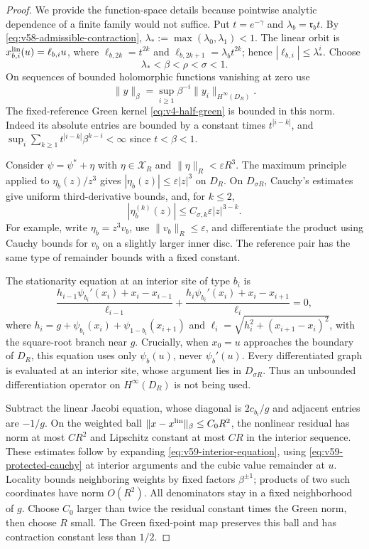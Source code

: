 \begin{proof}
We provide the function-space details because pointwise analytic dependence
of a finite family would not suffice.  Put $t=e^{-\gamma}$ and
$\lambda_b=\mathfrak r_bt$.  By
\eqref{eq:v58-admissible-contraction},
$\lambda_*:=\max(\lambda_0,\lambda_1)<1$.  The linear orbit is
$x^{\rm lin}_{b,i}(u)=\ell_{b,i}u$, where
$\ell_{b,2k}=t^{2k}$ and
$\ell_{b,2k+1}=\lambda_bt^{2k}$; hence
$|\ell_{b,i}|\le\lambda_*^i$.  Choose
\[
                   \lambda_*<\beta<\rho<\sigma<1.
\]
On sequences of bounded holomorphic functions vanishing at zero use
\[
 \|y\|_\beta=\sup_{i\ge1}\beta^{-i}\|y_i\|_{H^\infty(D_R)}.
\]
The fixed-reference Green kernel \eqref{eq:v4-half-green} is bounded
in this norm.  Indeed its absolute entries are bounded by a constant
times $t^{|i-k|}$, and
$\sup_i\sum_{k\ge1}t^{|i-k|}\beta^{k-i}<\infty$ since $t<\beta<1$.

Consider $\psi=\psi^*+\eta$ with
$\eta\in\mathscr X_R$ and $\|\eta\|_R<\varepsilon R^3$.
The maximum principle applied to $\eta_b(z)/z^3$ gives
$|\eta_b(z)|\le\varepsilon|z|^3$ on $D_R$.
On $D_{\sigma R}$, Cauchy's estimates give uniform third-derivative
bounds, and, for $k\le2$,
\begin{equation}\label{eq:v59-protected-cauchy}
 |\eta_b^{(k)}(z)|\le C_{\sigma,k}\varepsilon|z|^{3-k}.
\end{equation}
For example, write $\eta_b=z^3v_b$, use
$\|v_b\|_R\le\varepsilon$, and differentiate the product using
Cauchy bounds for $v_b$ on a slightly larger inner disc.  The reference
pair has the same type of remainder bounds with a fixed constant.

The stationarity equation at an interior site of type $b_i$ is
\begin{equation}\label{eq:v59-interior-equation}
 \frac{h_{i-1}\psi_{b_i}'(x_i)+x_i-x_{i-1}}{\ell_{i-1}}
 +\frac{h_i\psi_{b_i}'(x_i)+x_i-x_{i+1}}{\ell_i}=0,
\end{equation}
where $h_i=g+\psi_{b_i}(x_i)+\psi_{1-b_i}(x_{i+1})$ and
$\ell_i=\sqrt{h_i^2+(x_{i+1}-x_i)^2}$, with the square-root branch
near $g$.  Crucially, when $x_0=u$ approaches the boundary of $D_R$,
this equation uses only $\psi_b(u)$, never $\psi_b'(u)$.
Every differentiated graph is evaluated at an interior site, whose
argument lies in $D_{\sigma R}$.  Thus an unbounded differentiation
operator on $H^\infty(D_R)$ is not being used.

Subtract the linear Jacobi equation, whose diagonal is $2c_{b_i}/g$
and adjacent entries are $-1/g$.  On the weighted ball
$\|x-x^{\rm lin}\|_\beta\le C_0R^2$, the nonlinear residual has
norm at most $C R^2$ and Lipschitz constant at most $CR$ in the
interior sequence.  These estimates follow by expanding
\eqref{eq:v59-interior-equation}, using
\eqref{eq:v59-protected-cauchy} at interior arguments and the cubic
value remainder at $u$.  Locality bounds neighboring weights by fixed
factors $\beta^{\pm1}$; products of two such coordinates have norm
$O(R^2)$.  All denominators stay in a fixed neighborhood of $g$.
Choose $C_0$ larger than twice the residual constant times the Green
norm, then choose $R$ small.  The Green fixed-point map preserves this
ball and has contraction constant less than $1/2$.


\end{proof}
